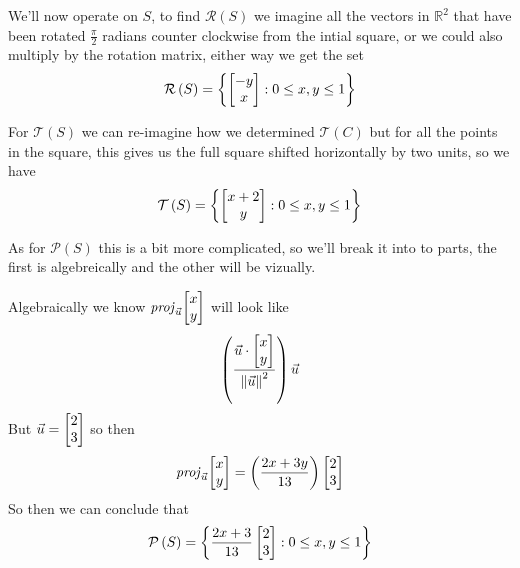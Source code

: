 \documentclass[11pt]{book}
\begin{document}
\begin{ex}
    We'll now operate on $S$, to find $\mathcal{R}\left(S\right)$ we imagine all the vectors in $\mathbb{R}^2$ that have been rotated $\frac{\pi }{2}$ radians counter clockwise from the intial square, or we could also multiply by the rotation matrix, either way we get the set
    \begin{equation*}
        \mathcal{R}\left(S\right) = \left\{ \begin{bmatrix} -y \\ x \end{bmatrix}: 0 \le x, y \le 1 \right\}
    \end{equation*}
\end{ex}

\begin{ex}
    For $\mathcal{T}\left(S\right)$ we can re-imagine how we determined $\mathcal{T}\left(C\right)$ but for all the points in the square, this gives us the full square shifted horizontally by two units, so we have
    \begin{equation*}
        \mathcal{T}\left(S\right) = \left\{ \begin{bmatrix} x + 2 \\ y \end{bmatrix}: 0 \le x, y \le 1 \right\}
    \end{equation*}
\end{ex}

\begin{ex}
    As for $\mathcal{P}\left(S\right)$ this is a bit more complicated, so we'll break it into to parts, the first is algebreically and the other will be vizually.

    Algebraically we know $\mathit{proj}_{\vec{u}} {\begin{bmatrix} x \\ y \end{bmatrix}} $ will look like
    \begin{equation*}
        \left( \frac{\vec{u} \cdot \begin{bmatrix} x \\ y \end{bmatrix}}{\left\Vert \vec{u} \right\Vert^2} \right) \vec{u}
    \end{equation*}
    But $\vec{u} = \begin{bmatrix} 2 \\ 3 \end{bmatrix}$ so then
    \begin{equation*}
        \mathit{proj}_{\vec{u}} {\begin{bmatrix} x \\ y \end{bmatrix}}  = \left( \frac{2x + 3y}{13} \right) \begin{bmatrix} 2 \\ 3 \end{bmatrix}
    \end{equation*}
    So then we can conclude that
    \begin{equation*}
        \mathcal{P}\left(S\right) = \left\{ \frac{2x + 3}{13} \begin{bmatrix} 2 \\ 3 \end{bmatrix} : 0 \le x, y \le 1 \right\}    
    \end{equation*}
\end{ex}
\end{document}
